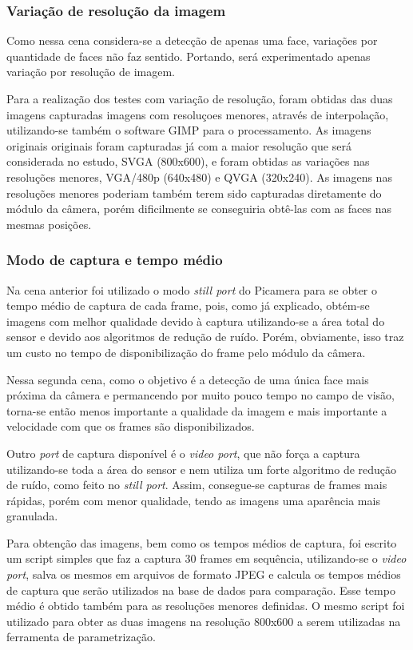 \subsubsection{Variação de resolução da imagem}

Como nessa cena considera-se a detecção de apenas uma face, variações por quantidade de faces não faz sentido. Portando, será experimentado apenas variação por resolução de imagem. 

Para a realização dos testes com variação de resolução, foram obtidas das duas imagens capturadas imagens com resoluçoes menores, através de interpolação, utilizando-se também o software GIMP para o processamento. As imagens originais originais foram capturadas já com a maior resolução que será considerada no estudo, SVGA (800x600), e foram obtidas as variações nas resoluções menores, VGA/480p (640x480) e QVGA (320x240). As imagens nas resoluções menores poderiam também terem sido capturadas diretamente do módulo da câmera, porém dificilmente se conseguiria obtê-las com as faces nas mesmas posições.

\subsubsection{Modo de captura e tempo médio}

Na cena anterior foi utilizado o modo \emph{still port} do Picamera para se obter o tempo médio de captura de cada frame, pois, como já explicado, obtém-se imagens com melhor qualidade devido à captura utilizando-se a área total do sensor e devido aos algoritmos de redução de ruído. Porém, obviamente, isso traz um custo no tempo de disponibilização do frame pelo módulo da câmera.

Nessa segunda cena, como o objetivo é a detecção de uma única face mais próxima da câmera e permancendo por muito pouco tempo no campo de visão, torna-se então menos importante a qualidade da imagem e mais importante a velocidade com que os frames são disponibilizados.

Outro \emph{port} de captura disponível é o \emph{video port}, que não força a captura utilizando-se toda a área do sensor e nem utiliza um forte algoritmo de redução de ruído, como feito no \emph{still port}. Assim, consegue-se capturas de frames mais rápidas, porém com menor qualidade, tendo as imagens uma aparência mais granulada. 

Para obtenção das imagens, bem como os tempos médios de captura, foi escrito um script simples que faz a captura 30 frames em sequência, utilizando-se o \emph{video port}, salva os mesmos em arquivos de formato JPEG e calcula os tempos médios de captura que serão utilizados na base de dados para comparação. Esse tempo médio é obtido também para as resoluções menores definidas. O mesmo script foi utilizado para obter as duas imagens na resolução 800x600 a serem utilizadas na ferramenta de parametrização. 


